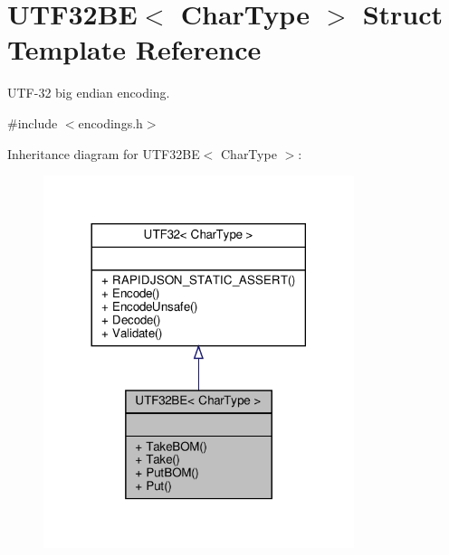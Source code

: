 \hypertarget{structUTF32BE}{}\section{U\+T\+F32\+BE$<$ Char\+Type $>$ Struct Template Reference}
\label{structUTF32BE}


U\+T\+F-\/32 big endian encoding.  




{\ttfamily \#include $<$encodings.\+h$>$}



Inheritance diagram for U\+T\+F32\+BE$<$ Char\+Type $>$\+:
\nopagebreak
\begin{figure}[H]
\begin{center}
\leavevmode
\includegraphics[width=257pt]{structUTF32BE__inherit__graph}
\end{center}
\end{figure}


